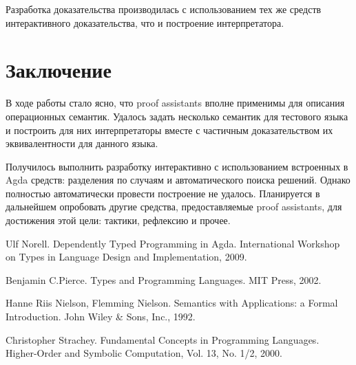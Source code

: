   Разработка доказательства производилась с использованием тех же средств интерактивного доказательства, что и построение интерпретатора.

  \section*{Заключение}

  В ходе работы стало ясно, что proof assistants вполне применимы для описания операционных семантик. Удалось задать несколько семантик для тестового языка и построить для них интерпретаторы вместе с частичным доказательством их эквивалентности для данного языка.

  Получилось выполнить разработку интерактивно с использованием встроенных в Agda средств: разделения по случаям и автоматического поиска решений. Однако полностью автоматически провести построение не удалось. Планируется в дальнейшем опробовать другие средства, предоставляемые proof assistants, для достижения этой цели: тактики, рефлексию и прочее.

\begin{thebibliography}{99}
Ulf Norell. Dependently Typed Programming in Agda. International Workshop on Types in Language Design and Implementation, 2009.


Benjamin C.Pierce. Types and Programming Languages. MIT Press, 2002.

Hanne Riis Nielson, Flemming Nielson. Semantics with Applications: a Formal Introduction. John Wiley \& Sons, Inc., 1992.

Christopher Strachey. Fundamental Concepts in Programming Languages.
Higher-Order and Symbolic Computation, Vol. 13, No. 1/2, 2000. 
\end{thebibliography}
